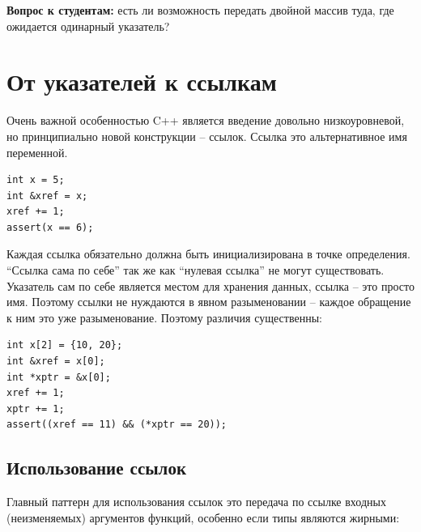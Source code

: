 \documentclass[a4paper,12pt,oneside]{book}
\newif\ifanswers
\begin{document}
\ifanswers
Но это не работает. Двумерный массив уже не может деградировать к указателю на указатель, а только к указателю на массив (из рисунка \ref{fig:c_arrays} причины должны быть уже очевидны). 
\fi

\textbf{Вопрос к студентам:} есть ли возможность передать двойной массив туда, где ожидается одинарный указатель?

\ifanswers
Ответ: да, есть забавный трюк.

\begin{lstlisting}
int func(int *a, int n, int m);
int a[2][3];
func (&a[0][0], 2, 3); /* ok */
\end{lstlisting}

Но внутри функции это потребует ручного обслуживания такого ``развернутого'' массива.
\fi

\pagebreak
\section{От указателей к ссылкам}\label{PointersAndRefs}

Очень важной особенностью C++ является введение довольно низкоуровневой, но принципиально новой конструкции – ссылок. Ссылка это альтернативное имя переменной.

\begin{lstlisting}
int x = 5;
int &xref = x;
xref += 1;
assert(x == 6);
\end{lstlisting}

Каждая ссылка обязательно должна быть инициализирована в точке определения. ``Ссылка сама по себе'' так же как ``нулевая ссылка'' не могут существовать. Указатель сам по себе является местом для хранения данных, ссылка – это просто имя. Поэтому ссылки не нуждаются в явном разыменовании – каждое обращение к ним это уже разыменование. Поэтому различия существенны:

\begin{lstlisting}
int x[2] = {10, 20};
int &xref = x[0];
int *xptr = &x[0];
xref += 1;
xptr += 1;
assert((xref == 11) && (*xptr == 20));
\end{lstlisting}

\subsection{Использование ссылок}

Главный паттерн для использования ссылок это передача по ссылке входных (неизменяемых) аргументов функций, особенно если типы являются жирными:
\end{document}
